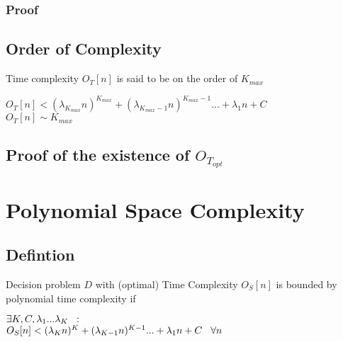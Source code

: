 \documentclass[11pt]{article}
\begin{document}
\subsubsection{Proof}




\subsection{Order of Complexity}
Time complexity $O_T[n]$ is said to be on the order of $K_{max}$
\begin{center}
$
O_T[n] < (\lambda_{K_{max}} n)^{K_{max}} + (\lambda_{K_{max}-1} n)^{K_{max}-1}... + \lambda_1 n + C
$
\\ \vspace{2mm}
$
O_T[n] \sim K_{max}
$
\end{center}


\subsection{Proof of the existence of $O_{T_{opt}}$}
















\newpage
\section{Polynomial Space Complexity}


\subsection{Defintion}
Decision problem $D$ with (optimal) Time Complexity $O_S[n]$ is bounded by polynomial time complexity if
\begin{center}
$\exists K,C,\lambda_1...\lambda_K \hspace{2mm} :$
\\ \vspace{2mm}
$O_S[n] < (\lambda_K n)^K + (\lambda_{K-1} n)^{K-1}... + \lambda_1 n + C \hspace{3mm} \forall n$
\end{center}
\end{document}
